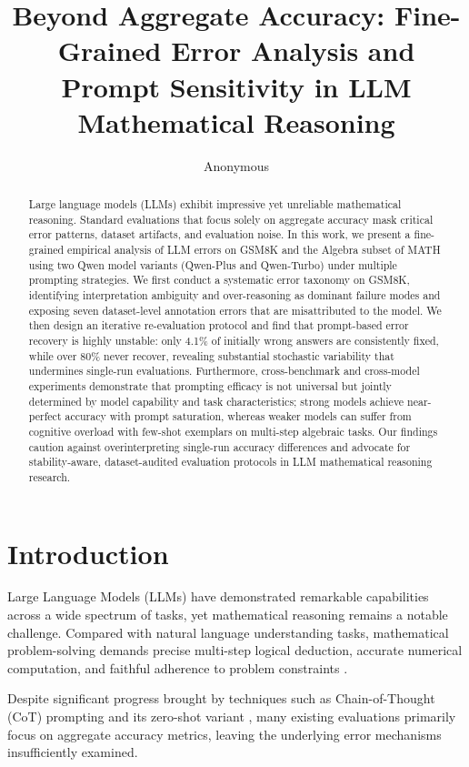 \documentclass{article}
\title{Beyond Aggregate Accuracy: Fine-Grained Error Analysis and Prompt Sensitivity in LLM Mathematical Reasoning}
\author{Anonymous}
\begin{document}
\maketitle 


\begin{abstract}
Large language models (LLMs) exhibit impressive yet unreliable mathematical 
reasoning. Standard evaluations that focus solely on aggregate accuracy mask 
critical error patterns, dataset artifacts, and evaluation noise. In this work, 
we present a fine-grained empirical analysis of LLM errors on GSM8K and the 
Algebra subset of MATH using two Qwen model variants (Qwen-Plus and 
Qwen-Turbo) under multiple prompting strategies. We first conduct a systematic 
error taxonomy on GSM8K, identifying interpretation ambiguity and 
over-reasoning as dominant failure modes and exposing seven dataset-level 
annotation errors that are misattributed to the model. We then design an 
iterative re-evaluation protocol and find that prompt-based error recovery is 
highly unstable: only 4.1\% of initially wrong answers are consistently 
fixed, while over 80\% never recover, revealing substantial stochastic 
variability that undermines single-run evaluations. Furthermore, 
cross-benchmark and cross-model experiments demonstrate that prompting 
efficacy is not universal but jointly determined by model capability and 
task characteristics; strong models achieve near-perfect accuracy with 
prompt saturation, whereas weaker models can suffer from cognitive overload 
with few-shot exemplars on multi-step algebraic tasks. Our findings caution 
against overinterpreting single-run accuracy differences and advocate for 
stability-aware, dataset-audited evaluation protocols in LLM mathematical 
reasoning research.
\end{abstract}

\section{Introduction}

Large Language Models (LLMs) have demonstrated remarkable capabilities across a wide spectrum of tasks, yet mathematical reasoning remains a notable challenge. Compared with natural language understanding tasks, mathematical problem-solving demands precise multi-step logical deduction, accurate numerical computation, and faithful adherence to problem constraints \cite{cobbe2021training, hendrycks2021measuring}. 

Despite significant progress brought by techniques such as Chain-of-Thought (CoT) prompting \cite{wei2022chain} and its zero-shot variant \cite{kojima2022large}, many existing evaluations primarily focus on aggregate accuracy metrics, leaving the underlying error mechanisms insufficiently examined.
\end{document}
